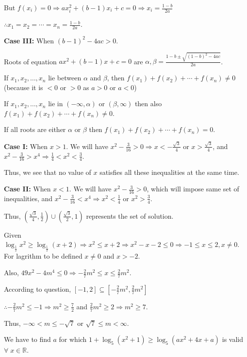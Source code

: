   But $f(x_i) = 0 \Rightarrow ax_i^2 + (b - 1)x_i + c = 0 \Rightarrow x_i = \frac{1 - b}{2a}$

  $\therefore x_1 = x_2 = \cdots = x_n = \frac{1 - b}{2a}$.

  {\bf Case III:} When $(b - 1)^2 - 4ac > 0$.

  Roots of equation $ax^2 + (b - 1)x + c = 0$ are $\alpha,\beta = \frac{1 - b\pm\sqrt{(1 - b)^2 -
      4ac}}{2a}$.

  If $x_1, x_2, \ldots, x_n$ lie between $\alpha$ and $\beta$, then $f(x_1) + f(x_2) + \cdots + f(x_n)\neq
  0$ (because it is $< 0$ or $> 0$ as $a > 0$ or $a < 0$)

  If $x_1, x_2, \ldots, x_n$ lie in $(-\infty, \alpha)$ or $(\beta, \infty)$ then also $f(x_1) + f(x_2) +
  \cdots + f(x_n)\neq 0$.

  If all roots are either $\alpha$ or $\beta$ then $f(x_1) + f(x_2) + \cdots + f(x_n) = 0$.
\item {\bf Case I:} When $x > 1$. We will have $x^2 - \frac{3}{16} > 0 \Rightarrow x < -\frac{\sqrt{3}}{4}$
  or $x > \frac{\sqrt{3}}{4}$, and $x^2 - \frac{3}{16} > x^4 \Rightarrow \frac{1}{4} < x^2 < \frac{3}{4}$.

  Thus, we see that no value of $x$ satisfies all these inequalities at the same time.

  {\bf Case II:} When $x < 1$. We will have $x^2 - \frac{3}{16} > 0$, which will impose same set of
  inequalities, and $x^2 - \frac{3}{16} < x^4 \Rightarrow x^2 < \frac{1}{4}$ or $x^2 > \frac{3}{4}$.

  Thus, $\left(\frac{\sqrt{3}}{4}, \frac{1}{2}\right)\cup\left(\frac{\sqrt{3}}{2}, 1\right)$ represents the
  set of solution.
\item Given $\log_{\tfrac{1}{2}}x^2 \geq \log_{\tfrac{1}{2}}(x + 2)\Rightarrow x^2\leq x + 2 \Rightarrow x^2
  - x - 2\leq 0 \Rightarrow -1 \leq x\leq 2, x\neq 0$. For lagrithm to be defined $x\neq 0$ and $x > -2$.

  Also, $49x^2 - 4m^4 \leq 0 \Rightarrow -\frac{2}{7}m^2\leq x \leq\frac{2}{7}m^2$.

  According to question, $[-1, 2]\subseteq \left[-\frac{2}{7}m^2, \frac{2}{7}m^2\right]$

  $\therefore -\frac{2}{7}m^2\leq -1 \Rightarrow m^2\geq \frac{7}{2}$ and $\frac{2}{7}m^2\geq 2 \Rightarrow
  m^2\geq 7$.

  Thus, $-\infty < m \leq -\sqrt{7}$ or $\sqrt{7}\leq m < \infty$.
\item We have to find $a$ for which $1 + \log_5(x^2 + 1) \geq \log_5(ax^2 + 4x + a)$ is valid
  $\forall\;x\in\mathbb{R}$.

